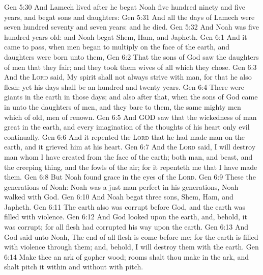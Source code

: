 \vs Gen 5:30 And Lamech lived after he begat Noah five hundred ninety and five years, and begat sons and daughters:
\vs Gen 5:31 And all the days of Lamech were seven hundred seventy and seven years: and he died.
\vs Gen 5:32 And Noah was five hundred years old: and Noah begat Shem, Ham, and Japheth.
\vs Gen 6:1 And it came to pass, when men began to multiply on the face of the earth, and daughters were born unto them,
\vs Gen 6:2 That the sons of God saw the daughters of men that they  fair; and they took them wives of all which they chose.
\vs Gen 6:3 And the \textsc{Lord} said, My spirit shall not always strive with man, for that he also  flesh: yet his days shall be an hundred and twenty years.
\vs Gen 6:4 There were giants in the earth in those days; and also after that, when the sons of God came in unto the daughters of men, and they bare  to them, the same  mighty men which  of old, men of renown.
\vs Gen 6:5 And GOD saw that the wickedness of man  great in the earth, and  every imagination of the thoughts of his heart  only evil continually.
\vs Gen 6:6 And it repented the \textsc{Lord} that he had made man on the earth, and it grieved him at his heart.
\vs Gen 6:7 And the \textsc{Lord} said, I will destroy man whom I have created from the face of the earth; both man, and beast, and the creeping thing, and the fowls of the air; for it repenteth me that I have made them.
\vs Gen 6:8 But Noah found grace in the eyes of the \textsc{Lord}.
\vs Gen 6:9 These  the generations of Noah: Noah was a just man  perfect in his generations,  Noah walked with God.
\vs Gen 6:10 And Noah begat three sons, Shem, Ham, and Japheth.
\vs Gen 6:11 The earth also was corrupt before God, and the earth was filled with violence.
\vs Gen 6:12 And God looked upon the earth, and, behold, it was corrupt; for all flesh had corrupted his way upon the earth.
\vs Gen 6:13 And God said unto Noah, The end of all flesh is come before me; for the earth is filled with violence through them; and, behold, I will destroy them with the earth.
\vs Gen 6:14 Make thee an ark of gopher wood; rooms shalt thou make in the ark, and shalt pitch it within and without with pitch.
